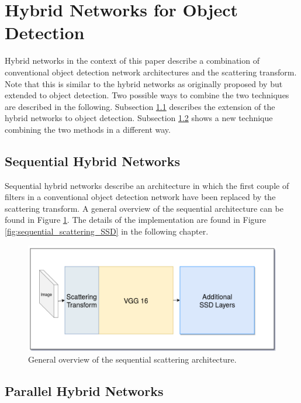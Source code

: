 \section{Hybrid Networks for Object Detection}
\label{sec:hybrid_networks_for_od}

Hybrid networks in the context of this paper describe a combination of conventional object detection network architectures and the scattering transform. Note that this is similar to the hybrid networks as originally proposed by \cite{ScalingTheScatteringTransform2017} but extended to object detection. Two possible ways to combine the two techniques are described in the following. Subsection \ref{subsec:sequential_hybrid} describes the extension of the hybrid networks to object detection. Subsection \ref{subsec:parallel_hybrid} shows a new technique combining the two methods in a different way. 

\subsection{Sequential Hybrid Networks}
\label{subsec:sequential_hybrid}

Sequential hybrid networks describe an architecture in which the first couple of filters in a conventional object detection network have been replaced by the scattering transform. A general overview of the sequential architecture can be found in Figure \ref{fig:sequential_scattering_overview}. The details of the implementation are found in Figure \ref{fig:sequential_scattering_SSD} in the following chapter. 

\begin{figure}[!htb]
	\centering
	\includegraphics[width=\textwidth]{images/sequential_scattering_overview.png}
	\caption{General overview of the sequential scattering architecture.}
	\label{fig:sequential_scattering_overview}	
\end{figure}


\subsection{Parallel Hybrid Networks}
\label{subsec:parallel_hybrid}

